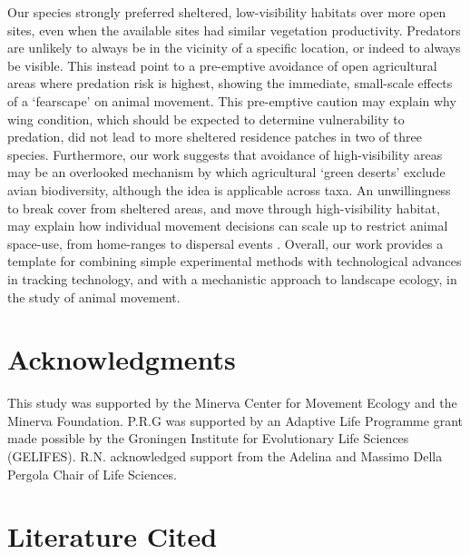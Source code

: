 \begin{refsection}
Our species strongly preferred sheltered, low-visibility habitats over more open sites, even when the available sites had similar vegetation productivity.
Predators are unlikely to always be in the vicinity of a specific location, or indeed to always be visible.
This instead point to a pre-emptive avoidance of open agricultural areas where predation risk is highest, showing the immediate, small-scale effects of a `fearscape' \cite{olsoy2015} on animal movement.
This pre-emptive caution may explain why wing condition, which should be expected to determine vulnerability to predation, did not lead to more sheltered residence patches in two of three species.
Furthermore, our work suggests that avoidance of high-visibility areas may be an overlooked mechanism by which agricultural `green deserts' exclude avian biodiversity, although the idea is applicable across taxa.
An unwillingness to break cover from sheltered areas, and move through high-visibility habitat, may explain how individual movement decisions can scale up to restrict animal space-use, from home-ranges to dispersal events \cite{schlagel2020}.
Overall, our work provides a template for combining simple experimental methods with technological advances in tracking technology, and with a mechanistic approach to landscape ecology, in the study of animal movement.

\section*{Acknowledgments}

This study was supported by the Minerva Center for Movement Ecology and the Minerva Foundation. 
P.R.G was supported by an Adaptive Life Programme grant made possible by the Groningen Institute for Evolutionary Life Sciences (GELIFES).
R.N. acknowledged support from the Adelina and Massimo Della Pergola Chair of Life Sciences.

\newrefcontext[sorting=nyt]
\section*{Literature Cited}
\printbibliography[title={Literature~Cited},heading=none]
\end{refsection}